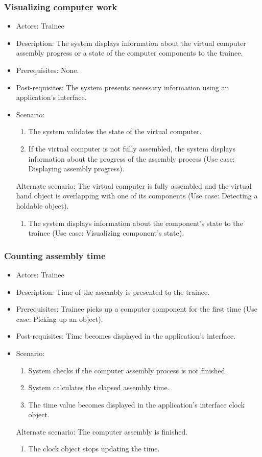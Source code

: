 \subsubsection{Visualizing computer work}
\begin{itemize}
\item Actors: Trainee
\item Description: The system displays information about the virtual computer assembly progress or a state of the computer components to the trainee.
\item Prerequisites: None.
\item Post-requisites: The system presents necessary information using an application's interface.
\item Scenario: 
\begin{enumerate}
    \item The system validates the state of the virtual computer.
    \item If the virtual computer is not fully assembled, the system displays information about the progress of the assembly process (Use case: Displaying assembly progress).
\end{enumerate}
Alternate scenario: The virtual computer is fully assembled and the virtual hand object is overlapping with one of its components (Use case: Detecting a holdable object).
\begin{enumerate}
    \item The system displays information about the component's state to the trainee (Use case: Visualizing component's state).
\end{enumerate}
\end{itemize}


\subsubsection{Counting assembly time}  
\begin{itemize}
\item Actors: Trainee
\item Description: Time of the assembly is presented to the trainee.
\item Prerequisites: Trainee picks up a computer component for the first time (Use case: Picking up an object).
\item Post-requisites: Time becomes displayed in the application's interface.
\item Scenario: 
\begin{enumerate}
    \item System checks if the computer assembly process is not finished.
    \item System calculates the elapsed assembly time.
    \item The time value becomes displayed in the application's interface clock object.
\end{enumerate}
Alternate scenario: The computer assembly is finished.
\begin{enumerate}
    \item The clock object stops updating the time.
\end{enumerate}
\end{itemize}

